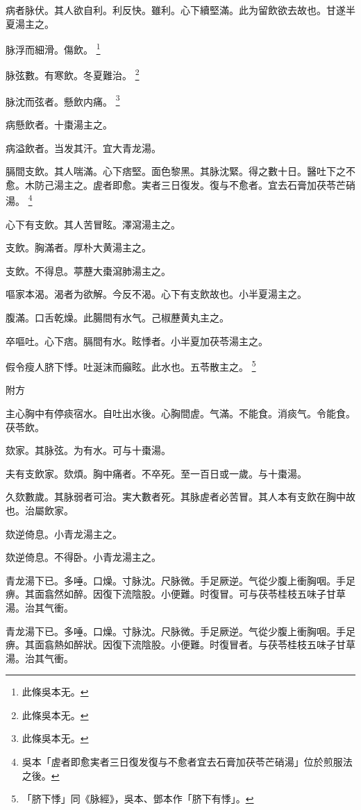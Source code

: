 病者脉伏。其人欲自利。利反快。雖利。心下續堅滿。此为留飲欲去故也。甘遂半夏湯主之。

脉浮而細滑。傷飲。
	\footnote{
	此條吳本无。
	}

脉弦數。有寒飲。冬夏難治。
	\footnote{
	此條吳本无。
	}

脉沈而弦者。懸飲内痛。
	\footnote{
	此條吳本无。
	}

病懸飲者。十棗湯主之。

病溢飲{\khaaitp 者}。当发其汗。宜大青龙湯。

膈間支飲。其人喘滿。心下痞堅。面色黎黑。其脉沈緊。得之數十日。醫吐下之不愈。木防己湯主之。虗者即愈。実者三日復发。復与不愈者。宜去石膏加茯苓芒硝湯。
	\footnote{
		吳本「虗者即愈実者三日復发復与不愈者宜去石膏加茯苓芒硝湯」位於煎服法之後。
	}

心下有支飲。其人苦冒眩。澤瀉湯主之。

支飲。胸滿者。厚朴大黄湯主之。

支飲。不得息。葶藶大棗瀉肺湯主之。

嘔家本渴。渴者为欲解。今反不渴。心下有支飲故也。小半夏湯主之。

腹滿。口舌乾燥。此腸間有水气。己椒藶黄丸主之。

卒嘔吐。心下痞。膈間有水。眩悸者。{\khaaitp 小}半夏加茯苓湯主之。

假令瘦人脐下悸。吐涎沫而癲眩。{\khaaitp 此}水也。五苓散主之。
	\footnote{
		「脐下悸」同《脉經》，吳本、鄧本作「脐下有悸」。
	}

附方

主心胸中有停痰宿水。自吐出水後。心胸間虗。气滿。不能食。消痰气。令能食。茯苓飲。

欬家。其脉弦。为有水。可与十棗湯。

夫有支飲家。欬煩。胸中痛者。不卒死。至一百日{\khaaitp 或}一歲。与十棗湯。

久欬數歲。其脉弱者可治。実大數者死。其脉虗者必苦冒。其人本有支飲在胸中故也。治屬飲家。

欬逆倚息。小青龙湯主之。{\wuben}

欬逆倚息。不得卧。小青龙湯主之。{\dengben}

青龙湯下已。多唾。口燥。寸脉沈。尺脉微。手足厥逆。气從少腹上衝胸咽。手足痹。其面翕然如醉。因復下流陰股。小便難。时復冒。可与茯苓桂枝五味子甘草湯。治其气衝。{\wuben}

青龙湯下已。多唾。口燥。寸脉沈。尺脉微。手足厥逆。气從少腹上衝胸咽。手足痹。其面翕熱如醉狀。因復下流陰股。小便難。时復冒者。与茯苓桂枝五味子甘草湯。治其气衝。{\dengben}

